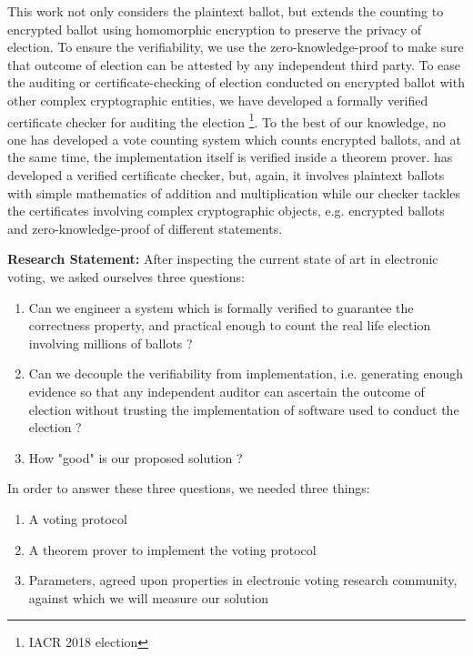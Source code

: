  This work not only considers the plaintext ballot, but extends the counting to encrypted ballot 
 using homomorphic encryption to preserve the privacy of election. To ensure the verifiability, 
 we use the zero-knowledge-proof to 
 make sure that outcome of election can be attested by any independent third party. To ease the 
 auditing or certificate-checking of election conducted on encrypted ballot with other complex 
 cryptographic entities, we have developed 
 a formally verified certificate checker for auditing the election \footnote{IACR 2018 election}. 
 To the best of our knowledge, no one has developed a vote counting system which counts encrypted 
 ballots, and at the same time, the implementation itself is verified inside a theorem prover.  
 \citep{10.1007/978-3-030-03592-1_5} has developed a verified certificate checker, but, again, 
 it involves plaintext ballots  with simple mathematics of addition and multiplication while  our checker
 tackles the certificates involving complex cryptographic 
 objects, e.g. encrypted ballots and zero-knowledge-proof of different statements.
 
 
\textbf{Research Statement:}
After inspecting the current state of art in electronic voting, we 
 asked ourselves three questions:
 \begin{enumerate}
  \item Can we engineer a system which is formally verified to 
    guarantee the correctness property, and practical enough
    to count the real life election involving millions of ballots ? 
 \item  Can we decouple the verifiability from implementation, i.e. 
    generating enough evidence so that any independent auditor can 
    ascertain the outcome of election without trusting the implementation 
    of software used to conduct the election ? 
  \item How "good"  is our proposed solution ?
  \end{enumerate}
  
  
 In order to answer these three questions, we needed three things:
\begin{enumerate}
  \item A voting protocol
  \item A theorem prover to implement the voting protocol
  \item Parameters, agreed upon properties in electronic voting research community, against which 
  		  we will measure our solution
\end{enumerate} 
 
